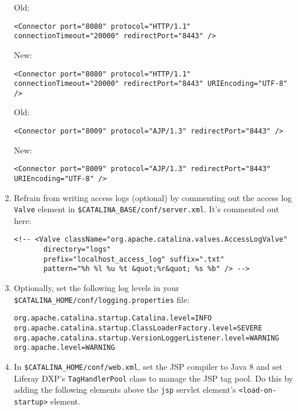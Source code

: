 \begin{enumerate}
  Old:

\begin{verbatim}
<Connector port="8080" protocol="HTTP/1.1" connectionTimeout="20000" redirectPort="8443" />
\end{verbatim}

  New:

\begin{verbatim}
<Connector port="8080" protocol="HTTP/1.1" connectionTimeout="20000" redirectPort="8443" URIEncoding="UTF-8" />
\end{verbatim}

  Old:

\begin{verbatim}
<Connector port="8009" protocol="AJP/1.3" redirectPort="8443" />
\end{verbatim}

  New:

\begin{verbatim}
<Connector port="8009" protocol="AJP/1.3" redirectPort="8443" URIEncoding="UTF-8" />
\end{verbatim}
\item
  Refrain from writing access logs (optional) by commenting out the
  access log \texttt{Valve} element in
  \texttt{\$CATALINA\_BASE/conf/server.xml}. It's commented out here:

\begin{verbatim}
<!-- <Valve className="org.apache.catalina.valves.AccessLogValve"
       directory="logs"
       prefix="localhost_access_log" suffix=".txt"
       pattern="%h %l %u %t &quot;%r&quot; %s %b" /> -->
\end{verbatim}
\item
  Optionally, set the following log levels in your
  \texttt{\$CATALINA\_HOME/conf/logging.properties} file:

\begin{verbatim}
org.apache.catalina.startup.Catalina.level=INFO
org.apache.catalina.startup.ClassLoaderFactory.level=SEVERE
org.apache.catalina.startup.VersionLoggerListener.level=WARNING
org.apache.level=WARNING
\end{verbatim}
\item
  In \texttt{\$CATALINA\_HOME/conf/web.xml}, set the JSP compiler to
  Java 8 and set Liferay DXP's \texttt{TagHandlerPool} class to manage
  the JSP tag pool. Do this by adding the following elements above the
  \texttt{jsp} servlet element's
  \texttt{\textless{}load-on-startup\textgreater{}} element.


\end{enumerate}
